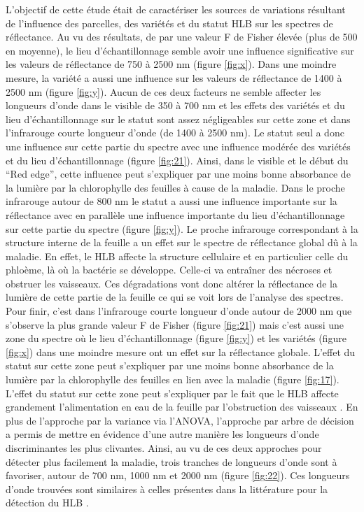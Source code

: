 \documentclass[
  11pt,
  french,
  a4paper,
  extrafontsizes,onecolumn,openright
  ]{memoir}
\begin{document}
L'objectif de cette étude était de caractériser les sources de variations résultant de l'influence des parcelles, des variétés et du statut HLB sur les spectres de réflectance.
Au vu des résultats, de par une valeur F de Fisher élevée (plus de 500 en moyenne), le lieu d'échantillonnage semble avoir une influence significative sur les valeurs de réflectance de 750 à 2500 nm (figure \ref{fig:x}). Dans une moindre mesure, la variété a aussi une influence sur les valeurs de réflectance de 1400 à 2500 nm (figure \ref{fig:y}). Aucun de ces deux facteurs ne semble affecter les longueurs d'onde dans le visible de 350 à 700 nm et les effets des variétés et du lieu d'échantillonnage sur le statut sont assez négligeables sur cette zone et dans l'infrarouge courte longueur d'onde (de 1400 à 2500 nm).
Le statut seul a donc une influence sur cette partie du spectre avec une influence modérée des variétés et du lieu d'échantillonnage (figure \ref{fig:21}). Ainsi, dans le visible et le début du ``Red edge'', cette influence peut s'expliquer par une moins bonne absorbance de la lumière par la chlorophylle des feuilles à cause de la maladie.
Dans le proche infrarouge autour de 800 nm le statut a aussi une influence importante sur la réflectance avec en parallèle une influence importante du lieu d'échantillonnage sur cette partie du spectre (figure \ref{fig:y}).
Le proche infrarouge correspondant à la structure interne de la feuille a un effet sur le spectre de réflectance global dû à la maladie. En effet, le HLB affecte la structure cellulaire et en particulier celle du phloème, là où la bactérie se développe. Celle-ci va entraîner des nécroses et obstruer les vaisseaux. Ces dégradations vont donc altérer la réflectance de la lumière de cette partie de la feuille ce qui se voit lors de l'analyse des spectres.
Pour finir, c'est dans l'infrarouge courte longueur d'onde autour de 2000 nm que s'observe la plus grande valeur F de Fisher (figure \ref{fig:21}) mais c'est aussi une zone du spectre où le lieu d'échantillonnage (figure \ref{fig:y}) et les variétés (figure \ref{fig:x}) dans une moindre mesure ont un effet sur la réflectance globale. L'effet du statut sur cette zone peut s'expliquer par une moins bonne absorbance de la lumière par la chlorophylle des feuilles en lien avec la maladie (figure \ref{fig:17}).
\vfill
\newpage
L'effet du statut sur cette zone peut s'expliquer par le fait que le HLB affecte grandement l'alimentation en eau de la feuille par l'obstruction des vaisseaux \autocite{bove_huanglongbing_2006}.
En plus de l'approche par la variance via l'ANOVA, l'approche par arbre de décision a permis de mettre en évidence d'une autre manière les longueurs d'onde discriminantes les plus clivantes. Ainsi, au vu de ces deux approches pour détecter plus facilement la maladie, trois tranches de longueurs d'onde sont à favoriser, autour de 700 nm, 1000 nm et 2000 nm (figure \ref{fig:22}). Ces longueurs d'onde trouvées sont similaires à celles présentes dans la littérature pour la détection du HLB \autocite{mishra_spectral_2007}.
\end{document}
